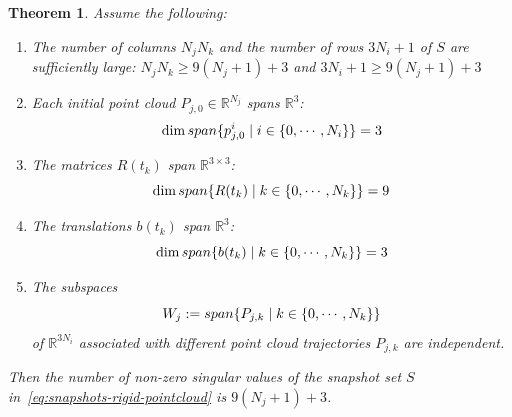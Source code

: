 \documentclass[10pt,a4paper]{amsart}
\newtheorem{theorem}{Theorem}
\newcommand{\R}{\mathbb{R}}                                 %
\begin{document}
\begin{theorem}
    Assume the following:
    \begin{enumerate}
        \item The number of columns $N_jN_k$ and the number of rows $3N_i+1$ of $S$ are sufficiently large: $N_jN_k \geq 9(N_j+1)+3$ and $3N_i+1 \geq 9(N_j+1)+3$
        \item Each initial point cloud $P_{j,0} \in \R^{N_j}$ spans $\R^3$: $$\dim\textnormal{span}\{p^i_{j,0}\;|\;i \in \{0,\cdots,N_i\}\} = 3$$
        \item The matrices $R(t_k)$ span $\R^{3\times 3}$: $$\dim\textnormal{span}\{R(t_k)\;|\;k \in \{0,\cdots,N_k\}\} = 9$$
        \item The translations $b(t_k)$ span $\R^3$: $$\dim\textnormal{span}\{b(t_k)\;|\;k \in \{0,\cdots,N_k\}\} = 3$$
        \item The subspaces $$W_j := \textnormal{span}\{P_{j,k}\;|\; k \in \{0,\cdots,N_k\} \}$$ of $\R^{3N_i}$ associated with different point cloud trajectories $P_{j,k}$ are independent. 
    \end{enumerate}  
    Then the number of non-zero singular values of the snapshot set $S$ in~\eqref{eq:snapshots-rigid-pointcloud} is $9(N_j+1)+3$.
\end{theorem}
\end{document}
